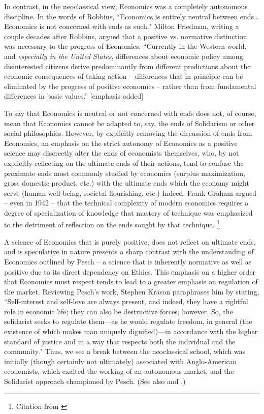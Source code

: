 \documentclass{article}
\begin{document}
In contrast, in the neoclassical view, Economics was a completely autonomous discipline.  In the words of Robbins, ``Economics is entirely neutral between ends…  Economics is not concerned with ends as such." \citep[p. 24]{robbins1932}  Milton Friedman, writing a couple decades after Robbins, argued that a positive vs. normative distinction was necessary to the progress of Economics.  ``Currently in the Western world, and \emph{especially in the United States}, differences about economic policy among disinterested citizens derive predominantly from different predictions about the economic consequences of taking action – differences that in principle can be eliminated by the progress of positive economics – rather than from fundamental differences in basic values.” [emphasis added] \citep[p. 5]{friedman1953}\medskip

To say that Economics is neutral or not concerned with ends does not, of course, mean that Economics cannot be adapted to, say, the ends of Solidarism or other social philosophies.  However, by explicitly removing the discussion of ends from Economics, an emphasis on the strict autonomy of Economics as a positive science may discreetly alter the ends of economists themselves, who, by not explicitly reflecting on the ultimate ends of their actions, tend to confuse the proximate ends most commonly studied by economics (surplus maximization, gross domestic product, etc.) with the ultimate ends which the economy might serve (human well-being, societal flourishing, etc.)  Indeed, Frank Graham argued – even in 1942 – that the technical complexity of modern economics requires a degree of specialization of knowledge that mastery of technique was emphasized to the detriment of reflection on the ends sought by that technique. \citep[p. 29]{graham1999}\footnote{Citation from \citet{yuengert2004}}\medskip

A science of Economics that is purely positive, does not reflect on ultimate ends, and is speculative in nature presents a sharp contrast with the understanding of Economics outlined by Pesch – a science that is inherently normative as well as positive due to its direct dependency on Ethics.  This emphasis on a higher order that Economics must respect tends to lead to a greater emphasis on regulation of the market.  Reviewing Pesch’s work, Stephen Krason paraphrases him by stating, ``Self-interest and self-love are always present, and indeed, they have a rightful role in economic life; they can also be destructive forces, however. So, the solidarist seeks to regulate them—as he would regulate freedom, in general (the existence of which makes man uniquely dignified)—in accordance with the higher standard of justice and in a way that respects both the individual and the community." \citep{krason2009}  Thus, we see a break between the neoclassical school, which was initially (though certainly not ultimately) associated with Anglo-American economists, which exalted the working of an autonomous market, and the Solidarist approach championed by Pesch.  (See also \citet{mulcahy1951} and \citet{yenni1951}.) \medskip
\end{document}
